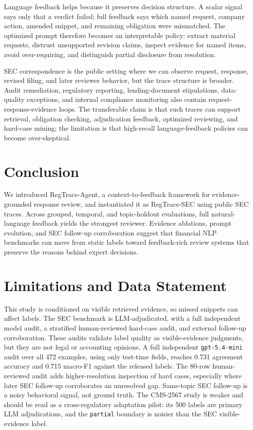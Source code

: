 \documentclass[11pt]{article}
\newcommand{\dataset}{RegTrace-SEC}
\newcommand{\framework}{RegTrace-Agent}
\begin{document}
Language feedback helps because it preserves decision structure. A scalar signal says only that a verdict failed; full feedback says which named request, company action, amended snippet, and remaining obligation were mismatched. The optimized prompt therefore becomes an interpretable policy: extract material requests, distrust unsupported revision claims, inspect evidence for named items, avoid over-requiring, and distinguish partial disclosure from resolution.

SEC correspondence is the public setting where we can observe request, response, revised filing, and later reviewer behavior, but the trace structure is broader. Audit remediation, regulatory reporting, lending-document stipulations, data-quality exceptions, and internal compliance monitoring also contain request-response-evidence loops. The transferable claim is that such traces can support retrieval, obligation checking, adjudication feedback, optimized reviewing, and hard-case mining; the limitation is that high-recall language-feedback policies can become over-skeptical.

\section{Conclusion}

We introduced \framework{}, a context-to-feedback framework for evidence-grounded response review, and instantiated it as \dataset{} using public SEC traces. Across grouped, temporal, and topic-holdout evaluations, full natural-language feedback yields the strongest reviewer. Evidence ablations, prompt evolution, and SEC follow-up corroboration suggest that financial NLP benchmarks can move from static labels toward feedback-rich review systems that preserve the reasons behind expert decisions.

\section*{Limitations and Data Statement}

This study is conditioned on visible retrieved evidence, so missed snippets can affect labels. The SEC benchmark is LLM-adjudicated, with a full independent model audit, a stratified human-reviewed hard-case audit, and external follow-up corroboration. These audits validate label quality as visible-evidence judgments, but they are not legal or accounting opinions. A full independent \texttt{gpt-5.4-mini} audit over all 472 examples, using only test-time fields, reaches 0.731 agreement accuracy and 0.715 macro-F1 against the released labels. The 80-row human-reviewed audit adds higher-resolution inspection of hard cases, especially where later SEC follow-up corroborates an unresolved gap. Same-topic SEC follow-up is a noisy behavioral signal, not ground truth. The CMS-2567 study is weaker and should be read as a cross-regulatory adaptation pilot: its 500 labels are primary LLM adjudications, and the \texttt{partial} boundary is noisier than the SEC visible-evidence label.
\end{document}
